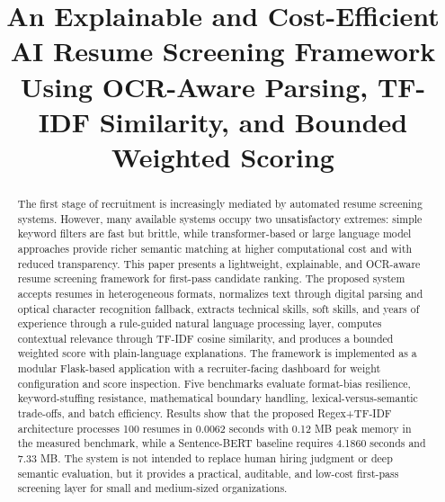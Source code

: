 \documentclass[conference]{IEEEtran}
\begin{document}
\title{An Explainable and Cost-Efficient AI Resume Screening Framework Using OCR-Aware Parsing, TF-IDF Similarity, and Bounded Weighted Scoring}

\author{
\and
{}
\and
{}
}

\maketitle

\begin{abstract}
The first stage of recruitment is increasingly mediated by automated resume screening systems. However, many available systems occupy two unsatisfactory extremes: simple keyword filters are fast but brittle, while transformer-based or large language model approaches provide richer semantic matching at higher computational cost and with reduced transparency. This paper presents a lightweight, explainable, and OCR-aware resume screening framework for first-pass candidate ranking. The proposed system accepts resumes in heterogeneous formats, normalizes text through digital parsing and optical character recognition fallback, extracts technical skills, soft skills, and years of experience through a rule-guided natural language processing layer, computes contextual relevance through TF-IDF cosine similarity, and produces a bounded weighted score with plain-language explanations. The framework is implemented as a modular Flask-based application with a recruiter-facing dashboard for weight configuration and score inspection. Five benchmarks evaluate format-bias resilience, keyword-stuffing resistance, mathematical boundary handling, lexical-versus-semantic trade-offs, and batch efficiency. Results show that the proposed Regex+TF-IDF architecture processes 100 resumes in 0.0062 seconds with 0.12 MB peak memory in the measured benchmark, while a Sentence-BERT baseline requires 4.1860 seconds and 7.33 MB. The system is not intended to replace human hiring judgment or deep semantic evaluation, but it provides a practical, auditable, and low-cost first-pass screening layer for small and medium-sized organizations.
\end{abstract}
\end{document}
